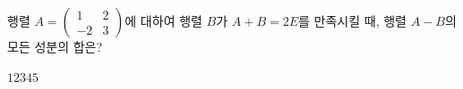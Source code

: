 \hspace*{2mm}\begin{minipage}[t]{\dimexpr\linewidth-2mm\relax}\vspace{0pt}
행렬 $A=\begin{pmatrix} 1 & 2 \\ -2 & 3 \end{pmatrix}$에 대하여 행렬 $B$가 $A+B=2E$를 만족시킬 때, 행렬 $A-B$의 모든 성분의 합은? 
\begin{choices32}{$1$}{$2$}{$3$}{$4$}{$5$}\end{choices32}\end{minipage}
